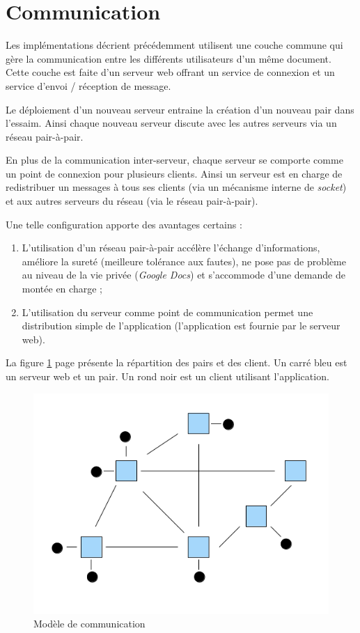 \section{Communication}
Les implémentations décrient précédemment utilisent une couche commune qui gère
la communication entre les différents utilisateurs d'un même document. Cette
couche est faite d'un serveur web offrant un service de connexion et un service
d'envoi / réception de message.

Le déploiement d'un nouveau serveur entraine la création d'un nouveau pair
dans l'essaim. Ainsi chaque nouveau serveur discute avec les autres serveurs
via un réseau pair-à-pair. 

En plus de la communication inter-serveur, chaque
serveur se comporte comme un point de connexion pour plusieurs clients. Ainsi
un serveur est en charge de redistribuer un messages à tous ses clients (via
un mécanisme interne de \emph{socket}) et aux autres serveurs du réseau (via
le réseau pair-à-pair).

Une telle configuration apporte des avantages certains :
\begin{enumerate}
 \item L'utilisation d'un réseau pair-à-pair accélère l'échange d'informations,
 améliore la sureté (meilleure tolérance aux fautes), ne pose pas de problème
 au niveau de la vie privée (\emph{Google Docs}) et s'accommode d'une demande
 de montée en charge ;
 \item L'utilisation du serveur comme point de communication permet une
 distribution simple de l'application (l'application est fournie par le
 serveur web).
\end{enumerate}

La figure \ref{fig:commu} page \pageref{fig:commu} présente la répartition des
pairs et des client. Un carré bleu est un serveur web et un pair. Un rond noir
est un client utilisant l'application.

\begin{figure}[hbt]
  \center
  \includegraphics[width=.8\textwidth]{includes/network-model.png}
  \caption{Modèle de communication}
  \label{fig:commu}
\end{figure}

